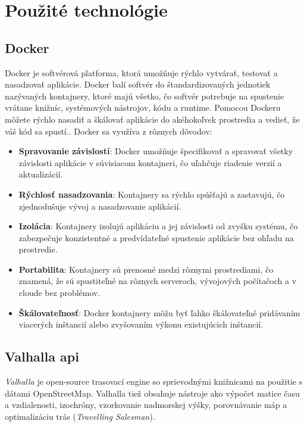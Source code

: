 \section{Použité technológie}
\subsection{Docker}

\indent \indent Docker je softvérová platforma, ktorá umožňuje rýchlo vytvárať, testovať a nasadzovať aplikácie. Docker balí softvér do štandardizovaných jednotiek nazývaných kontajnery, ktoré majú všetko, čo softvér potrebuje na spustenie vrátane knižníc, systémových nástrojov, kódu a runtime. Pomocou Dockeru môžete rýchlo nasadiť a škálovať aplikácie do akéhokoľvek prostredia a vedieť, že váš kód sa spustí.\cite{docker}. Docker sa využíva z rôznych dôvodov\cite{whyDocker}: 
\begin{itemize}
    \item \textbf{Spravovanie závislostí}: Docker umožňuje špecifikovať a spravovať všetky závislosti aplikácie v súvisiacom kontajneri, čo uľahčuje riadenie verzií a aktualizácií.
    \item \textbf{Rýchlosť nasadzovania}: Kontajnery sa rýchlo spúšťajú a zastavujú, čo zjednodušuje vývoj a nasadzovanie aplikácií.
    \item \textbf{Izolácia}: Kontajnery izolujú aplikáciu a jej závislosti od zvyšku systému, čo zabezpečuje konzistentné a predvídateľné spustenie aplikácie bez ohľadu na prostredie.
    \item \textbf{Portabilita}: Kontajnery sú prenosné medzi rôznymi prostrediami, čo znamená, že sú spustiteľné na rôznych serveroch, vývojových počítačoch a v cloude bez problémov.
    \item \textbf{Škálovateľnosť}: Docker kontajnery môžu byť ľahko škálovateľné pridávaním viacerých inštancií alebo zvyšovaním výkonu existujúcich inštancií.
\end{itemize}
\subsection{Valhalla api \label{section:valhalla}}

\indent \indent \textit{Valhalla} je open-source trasovací engine so sprievodnými knižnicami na použitie s dátami OpenStreetMap. Valhalla tiež obsahuje nástroje ako výpočet matice času a vzdialenosti, izochróny, vzorkovanie nadmorskej výšky, porovnávanie máp a optimalizáciu trás (\textit{Travelling Salesman})\cite{valhalla}.\\

